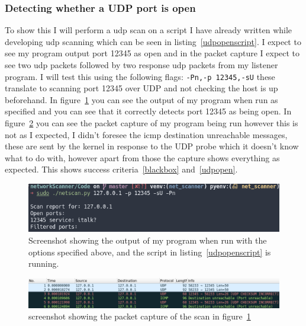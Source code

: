 \documentclass[titlepage]{article}
\let\Oldsubsubsection\subsubsection{}
\renewcommand{\subsubsection}{\FloatBarrier\Oldsubsubsection}
\begin{document}
\subsubsection{Detecting whether a UDP port is open}
To show this I will perform a \gls{udp} scan on a script I have already written while
developing \gls{udp} scanning which can be seen in listing~\ref{udpopenscript}.
I expect to see my program output port 12345 as open and in the packet capture I
expect to see two \gls{udp} packets followed by two response \gls{udp} packets from my
listener program. I will test this using the following flags: \verb|-Pn,-p 12345,-sU|
these translate to scanning port 12345 over UDP and not checking the host is up beforehand.
In figure~\ref{udpopenoutput} you can see the output of my program when run as specified
and you can see that it correctly detects port 12345 as being open.
In figure~\ref{udpopenpcap} you can see the packet capture of my program being run
however this is not as I expected, I didn't foresee the \gls{icmp} destination unreachable
messages, these are sent by the kernel in response to the UDP probe which it doesn't know what
to do with, however apart from those the capture shows everything as expected.
This shows success criteria~\ref{blackbox} and~\ref{udpopen}.



\begin{figure}[H]
  \centering
  \includegraphics[width=\textwidth]{screenshots/udpopenoutput.png}
  \caption{%
    Screenshot showing the output of my program when run with the options specified
    above, and the script in listing~\ref{udpopenscript} is running.
  }\label{udpopenoutput}
\end{figure}

\begin{figure}[H]
  \centering
  \includegraphics[width=\textwidth]{screenshots/udpopenpcap.png}
  \caption{%
    screenshot showing the packet capture of the scan in figure~\ref{udpopenoutput}
  }\label{udpopenpcap}
\end{figure}
\end{document}
